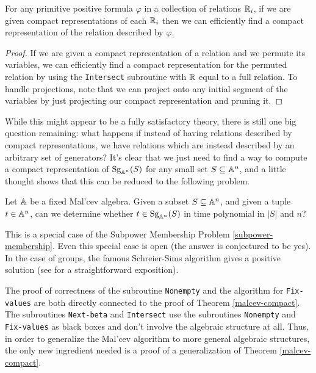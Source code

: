 \documentclass[letterpaper,11pt]{article}
\DeclareMathOperator{\Sg}{Sg}
\begin{document}
\begin{cor} For any primitive positive formula $\varphi$ in a collection of relations $\mathbb{R}_i$, if we are given compact representations of each $\mathbb{R}_i$ then we can efficiently find a compact representation of the relation described by $\varphi$.
\end{cor}
\begin{proof} If we are given a compact representation of a relation and we permute its variables, we can efficiently find a compact representation for the permuted relation by using the \texttt{Intersect} subroutine with $\mathbb{R}$ equal to a full relation. To handle projections, note that we can project onto any initial segment of the variables by just projecting our compact representation and pruning it.
\end{proof}

While this might appear to be a fully satisfactory theory, there is still one big question remaining: what happens if instead of having relations described by compact representations, we have relations which are instead described by an arbitrary set of generators? It's clear that we just need to find a way to compute a compact representation of $\Sg_{\bA^n}(S)$ for any small set $S \subseteq \mathbb{A}^n$, and a little thought shows that this can be reduced to the following problem.

\begin{prob} Let $\mathbb{A}$ be a fixed Mal'cev algebra. Given a subset $S \subseteq \mathbb{A}^n$, and given a tuple $t \in \mathbb{A}^n$, can we determine whether $t \in \Sg_{\bA^n}(S)$ in time polynomial in $|S|$ and $n$?
\end{prob}

This is a special case of the Subpower Membership Problem \ref{subpower-membership}. Even this special case is open (the answer is conjectured to be yes). In the case of groups, the famous Schreier-Sims algorithm gives a positive solution (see \cite{group-algorithms} for a straightforward exposition).

\begin{rem} The proof of correctness of the subroutine \texttt{Nonempty} and the algorithm for \texttt{Fix-values} are both directly connected to the proof of Theorem \ref{malcev-compact}. The subroutines \texttt{Next-beta} and \texttt{Intersect} use the subroutines \texttt{Nonempty} and \texttt{Fix-values} as black boxes and don't involve the algebraic structure at all. Thus, in order to generalize the Mal'cev algorithm to more general algebraic structures, the only new ingredient needed is a proof of a generalization of Theorem \ref{malcev-compact}.
\end{rem}
\end{document}
